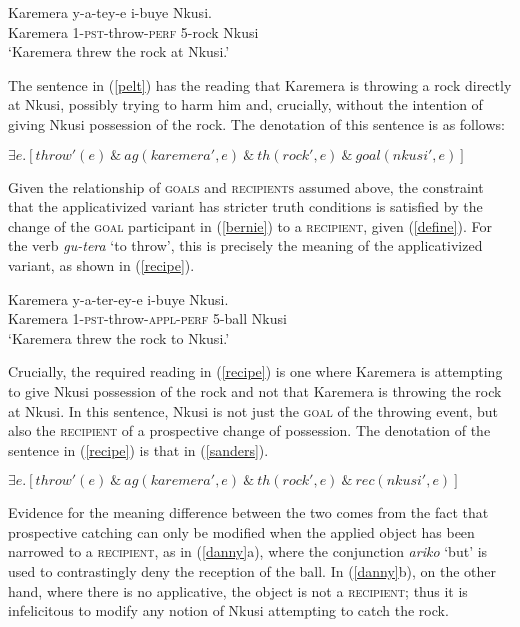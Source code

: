 \documentclass[output=paper]{langsci/langscibook}
\begin{document}
\begin{exe}
\ex\label{pelt}\gll Karemera y-a-tey-e i-buye Nkusi.\\
      Karemera 1-{\scshape pst-}throw-{\scshape perf} 5-rock Nkusi\\
      \glt `Karemera threw the rock at Nkusi.'
\end{exe}
The sentence in (\ref{pelt}) has the reading that Karemera is throwing a rock directly at Nkusi, possibly trying to harm him and, crucially, without the intention of giving Nkusi possession of the rock. The denotation of this sentence is as follows:
\begin{exe}
\ex\label{bernie} $\exists e.[throw'(e) \ \&\ ag(karemera', e) \ \&\ th(rock', e) \ \&\ goal(nkusi', e)]$ 

\end{exe}

Given the relationship of {\scshape goals} and {\scshape recipients} assumed above, the constraint that the applicativized variant has stricter truth conditions is satisfied by the change of the {\scshape goal} participant in (\ref{bernie}) to a {\scshape recipient}, given (\ref{define}).  For the verb \emph{gu-tera} `to throw', this is precisely the meaning of the applicativized variant, as shown in (\ref{recipe}). 

\begin{exe}
      \ex\label{recipe}\gll Karemera y-a-ter-ey-e i-buye Nkusi.\\
				      Karemera 1-{\scshape pst-}throw-{\scshape appl-perf}	5-ball Nkusi\\
				      \glt `Karemera threw the rock to Nkusi.'
\end{exe}
%
Crucially, the required reading in (\ref{recipe}) is one where Karemera is attempting to give Nkusi possession of the rock and not that Karemera is throwing the rock at Nkusi. In this sentence, Nkusi is not just the {\scshape goal} of the throwing event, but also the {\scshape recipient} of a prospective change of possession. The denotation of the sentence in (\ref{recipe}) is that in (\ref{sanders}).

\begin{exe}
\ex\label{sanders}  $\exists e.[throw'(e) \ \&\ ag(karemera', e) \ \&\ th(rock', e) \ \&\ rec(nkusi', e)]$ 
\end{exe}

Evidence for the meaning difference between the two comes from the fact that prospective catching can only be modified when the applied object has been narrowed to a {\scshape recipient}, as in (\ref{danny}a), where the conjunction \emph{ariko} `but' is used to contrastingly deny the reception of the ball.  In (\ref{danny}b), on the other hand, where there is no applicative, the object is not a {\scshape recipient}; thus it is infelicitous to modify any notion of Nkusi attempting to catch the rock. 
\end{document}
